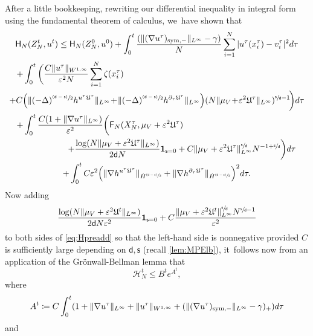 \documentclass[10pt]{amsart}
\newcommand{\psfrac}[2]{\sfrac{(#1)}{#2}}
\newcommand{\sym}{\textup{sym}}
\theoremstyle{plain}
\theoremstyle{definition}
\DeclarePairedDelimiter{\pa}{\lparen}{\rparen}
\newcommand{\Bpa}[1]{\Bigl(#1\Bigr)}
\let\div\relax
\DeclareMathOperator{\div}{\mathrm{div}}
\let\ga\gamma
\let\vep\varepsilon
\let\p\partial
\let\ux X
\let\uz Z
\newcommand{\indic}{\mathbf{1}}
\newcommand{\Uu}{\mathfrak{U}}
\newcommand{\Fr}{\mathsf{F}}
\newcommand{\Hr}{\mathsf{H}}
\renewcommand{\d}{\mathsf{d}}
\newcommand{\s}{\mathsf{s}}
\begin{document}
After a little bookkeeping, rewriting our differential inequality in integral form using the fundamental theorem of calculus, we~have shown that
\begin{multline}\label{eq:Hpreadd}
\Hr_{N}(\uz_N^t,u^t) \leq \Hr_{N}(\uz_N^0,u^0) + \int_0^t\frac{(\|(\nabla u^\tau)_{\sym,-}\|_{L^\infty}-\ga)}{N}\sum_{i=1}^N |u^\tau(x_i^\tau)-v_i^\tau|^2 d\tau \\
\shoveleft{+ \int_0^t\bigg(\frac{C\|u^\tau\|_{W^{1,\infty}}}{\vep^2N}\sum_{i=1}^N \zeta(x_i^\tau)}\\
+ C\Bpa{\|(-\Delta)^{\psfrac{\d-\s}{2}}\div h^{u^\tau\Uu^\tau}\|_{L^\infty}\!+\!\|(-\Delta)^{\psfrac{\d-\s}{2}}h^{\p_\tau\Uu^\tau}\|_{L^\infty}}(N\|{\mu_V\!+\!\vep^2\Uu^\tau}\|_{L^\infty})^{\sfrac{\s}{\d}-1}\!\bigg) d\tau\\
\shoveleft{+\int_0^t\frac{C(1+\|\nabla u^\tau\|_{L^\infty})}{\vep^2}\bigg(\Fr_N (\ux_N^\tau,\mu_V+\vep^2\Uu^\tau)} \\
\shoveright{+ \frac{\log(N\|\mu_V+\vep^2\Uu^\tau\|_{L^\infty})}{2\d N}\indic_{\s=0} + C \|\mu_V+\vep^2\Uu^\tau\|_{L^\infty}^{\sfrac{\s}{\d}} N^{-1+\sfrac{\s}{\d}}\bigg)d\tau}\\
+\int_0^t C\vep^2\pa*{\|\nabla\div h^{u^\tau\Uu^\tau}\|_{\dot{H}^{\psfrac{\d-\s}{2}}} + \|\nabla h^{\p_\tau\Uu^\tau}\|_{\dot{H}^{\psfrac{\d-\s}{2}}}}^2d\tau.
\end{multline}
Now adding
\begin{equation*}
\frac{\log(N\|\mu_V+\vep^2\Uu^t\|_{L^\infty})}{2\d N\vep^2}\indic_{\s=0} + C\frac{\|\mu_V+\vep^2\Uu^t\|_{L^\infty}^{\sfrac{\s}{\d}}N^{\sfrac{\s}{\d}-1}}{\vep^2}
\end{equation*}
to both sides of \eqref{eq:Hpreadd} so that the left-hand side is nonnegative provided $C$ is sufficiently large depending on $\d,\s$ (recall \cref{lem:MPElb}), it~follows now from an application of the Grönwall-Bellman lemma that
\begin{equation*}
\mathscr{H}_{N}^t \leq B^t e^{A^t},
\end{equation*}
where
\begin{equation*}
A^t\coloneqq C\int_0^t \pa*{1+\|\nabla u^\tau\|_{L^\infty} + \|u^\tau\|_{W^{1,\infty}} + (\|(\nabla u^\tau)_{\sym,-}\|_{L^\infty}-\ga)_+}d\tau
\end{equation*}
and
\end{document}
